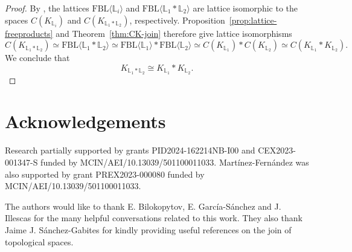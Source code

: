 \documentclass[12pt]{amsart}
\newcommand{\FBL}{\mathrm{FBL}}
\theoremstyle{plain}
\theoremstyle{definition}
\begin{document}
\begin{proof}
By \cite[Theorem~2.7]{freebanlatlatproj}, the lattices $\FBL\langle \mathbb L_i\rangle$ and $\FBL\langle \mathbb L_1\ast \mathbb L_2\rangle$ are lattice isomorphic to the spaces $C(K_{\mathbb L_i})$ and $C(K_{\mathbb L_1\ast \mathbb L_2})$, respectively. Proposition~\ref{prop:lattice-freeproducts} and Theorem~\ref{thm:CK-join} therefore give lattice isomorphisms
\[
C(K_{\mathbb L_1\ast \mathbb L_2})
\simeq
\FBL\langle \mathbb L_1\ast \mathbb L_2\rangle
\simeq
\FBL\langle \mathbb L_1\rangle\ast \FBL\langle \mathbb L_2\rangle
\simeq
C(K_{\mathbb L_1})\ast C(K_{\mathbb L_2})
\simeq
C(K_{\mathbb L_1}\ast K_{\mathbb L_2}).
\]
We conclude that
\[
K_{\mathbb L_1\ast \mathbb L_2}\cong K_{\mathbb L_1}\ast K_{\mathbb L_2}.
\]
\end{proof}

\section*{Acknowledgements}
Research partially supported by grants PID2024-162214NB-I00 and CEX2023-001347-S funded by MCIN/AEI/10.13039/501100011033. Martínez-Fernández was also supported by grant PREX2023-000080 funded by MCIN/AEI/10.13039/501100011033. 

The authors would like to thank E. Bilokopytov, E. García-Sánchez and J. Illescas for the many helpful conversations related to this work. They also thank Jaime J. Sánchez-Gabites for kindly providing useful references on the join of topological spaces.



\end{document}
